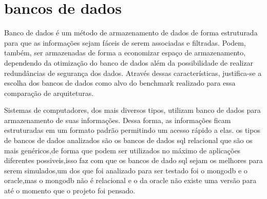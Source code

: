 \documentclass[
	12pt,				%
	openright,			%
	oneside,			%
	a4paper,			%
	english,			%
	french,				%
	spanish,			%
	brazil,				%
	]{abntex2}
\begin{document}
\section{bancos de dados}
\label{sec: bancos de dados}
Banco de dados é um método de armazenamento de dados de forma estruturada para que as informações sejam fáceis de serem associadas e filtradas. Podem, também, ser armazenadas de forma a economizar espaço de armazenamento, dependendo da otimização do banco de dados além da possibilidade de realizar redundâncias de segurança dos dados. Através dessas características, justifica-se a escolha dos bancos de dados como alvo do benchmark realizado para essa comparação de arquiteturas.

Sistemas de computadores, dos mais diversos tipos, utilizam banco de dados para armazenamento de suas informações. Dessa forma, as informações ficam estruturadas em um formato padrão permitindo um acesso rápido a elas.
os tipos de bancos de dados analizados são os bancos de dados sql relacional que são os mais genéricos,de forma que podem ser utilizados no máximo de aplicações diferentes possiveis,isso faz com que os bancos de dado sql sejam os melhores para serem simulados,um dos que foi analizado para ser testado foi o mongodb e o oracle,mas o mongodb não é relacional e o da oracle não existe uma versão para  até o momento que o projeto foi pensado.
\end{document}
